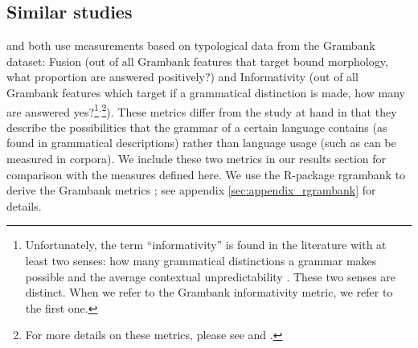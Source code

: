 \documentclass[USenglish]{article}
\begin{document}
\subsection{Similar studies}
\cite{grambank_release} and \citet{shcherbakova2023societies} both use measurements based on typological data from the Grambank dataset: Fusion (out of all Grambank features that target bound morphology, what proportion are answered positively?) and Informativity (out of all Grambank features which target if a grammatical distinction is made, how many are answered yes?\footnote{Unfortunately, the term ``informativity'' is found in the literature with at least two senses: how many grammatical distinctions a grammar makes possible \citep{shcherbakova2023societies, grambank_release} and the average contextual unpredictability \citep{cohen2008phone}. These two senses are distinct. When we refer to the Grambank informativity metric, we refer to the first one.}$^{,}$\footnote{For more details on these metrics, please see \citet{grambank_release} and \citet{R-rgrambank}.}). These metrics differ from the study at hand in that they describe the possibilities that the grammar of a certain language contains (as found in grammatical descriptions) rather than language usage (such as can be measured in corpora). 
We include these two metrics in our results section for comparison with the measures defined here. 
We use the R-package rgrambank to derive the Grambank metrics \citep{R-rgrambank}; see appendix \ref{sec:appendix_rgrambank} for details.
\end{document}
